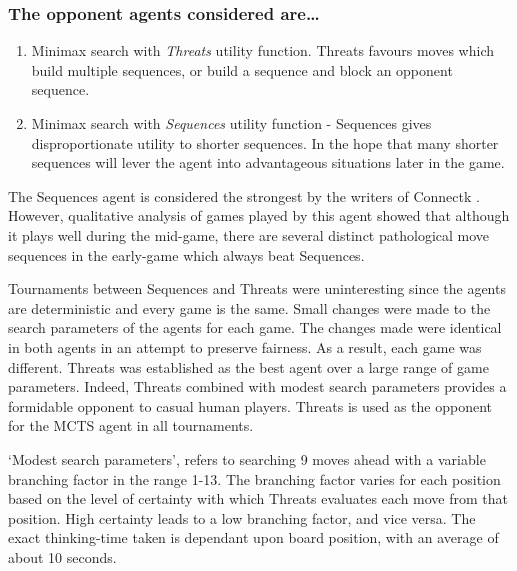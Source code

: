 \subsubsection{The opponent agents considered are\ldots}

\begin{enumerate}
\item {Minimax} search with \textit{Threats} utility function. {Threats} favours moves which build multiple sequences, or build a sequence and block an opponent sequence.
\item {Minimax} search with \textit{Sequences} utility function - {Sequences} gives disproportionate utility to shorter sequences. In the hope that many shorter sequences will lever the agent into advantageous situations later in the game.
\end{enumerate}

The {Sequences} agent is considered the strongest by the writers of {Connectk} \cite{connectk}. However, qualitative analysis of games played by this agent showed that although it plays well during the mid-game, there are several distinct pathological move sequences in the early-game which always beat {Sequences}. 

Tournaments between {Sequences} and {Threats} were uninteresting since the agents are deterministic and every game is the same. Small changes were made to the search parameters of the agents for each game. The changes made were identical in both agents in an attempt to preserve fairness. As a result, each game was different. {Threats} was established as the best agent over a large range of game parameters. Indeed, {Threats} combined with modest search parameters provides a formidable opponent to casual human players. {Threats} is used as the opponent for the {MCTS} agent in all tournaments. 

`Modest search parameters', refers to searching 9 moves ahead with a variable branching factor in the range 1-13. The branching factor varies for each position based on the level of certainty with which {Threats} evaluates each move from that position. High certainty leads to a low branching factor, and vice versa. The exact thinking-time taken is dependant upon board position, with an average of about 10 seconds.

